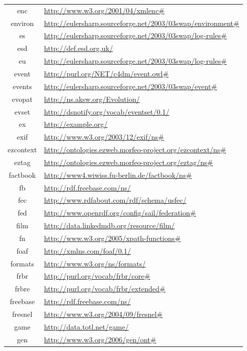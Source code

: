 \documentclass{article}
\begin{document}
\begin{longtable}{ c | p{8cm} }
		enc & \url{http://www.w3.org/2001/04/xmlenc#} \\
		environ & \url{http://eulersharp.sourceforge.net/2003/03swap/environment#} \\
		es & \url{http://eulersharp.sourceforge.net/2003/03swap/log-rules#} \\
		esd & \url{http://def.esd.org.uk/} \\
		eu & \url{http://eulersharp.sourceforge.net/2003/03swap/log-rules#} \\
		event & \url{http://purl.org/NET/c4dm/event.owl#} \\
		events & \url{http://eulersharp.sourceforge.net/2003/03swap/event#} \\
		evopat & \url{http://ns.aksw.org/Evolution/} \\
		evset & \url{http://dsnotify.org/vocab/eventset/0.1/} \\
		ex & \url{http://example.org/} \\
		exif & \url{http://www.w3.org/2003/12/exif/ns#} \\
		ezcontext & \url{http://ontologies.ezweb.morfeo-project.org/ezcontext/ns#} \\
		eztag & \url{http://ontologies.ezweb.morfeo-project.org/eztag/ns#} \\
		factbook & \url{http://www4.wiwiss.fu-berlin.de/factbook/ns#} \\
		fb & \url{http://rdf.freebase.com/ns/} \\
		fec & \url{http://www.rdfabout.com/rdf/schema/usfec/} \\
		fed & \url{http://www.openrdf.org/config/sail/federation#} \\
		film & \url{http://data.linkedmdb.org/resource/film/} \\
		fn & \url{http://www.w3.org/2005/xpath-functions#} \\
		foaf & \url{http://xmlns.com/foaf/0.1/} \\
		formats & \url{http://www.w3.org/ns/formats/} \\
		frbr & \url{http://purl.org/vocab/frbr/core#} \\
		frbre & \url{http://purl.org/vocab/frbr/extended#} \\
		freebase & \url{http://rdf.freebase.com/ns/} \\
		fresnel & \url{http://www.w3.org/2004/09/fresnel#} \\
		game & \url{http://data.totl.net/game/} \\
		gen & \url{http://www.w3.org/2006/gen/ont#} \\

\end{longtable}
\end{document}
